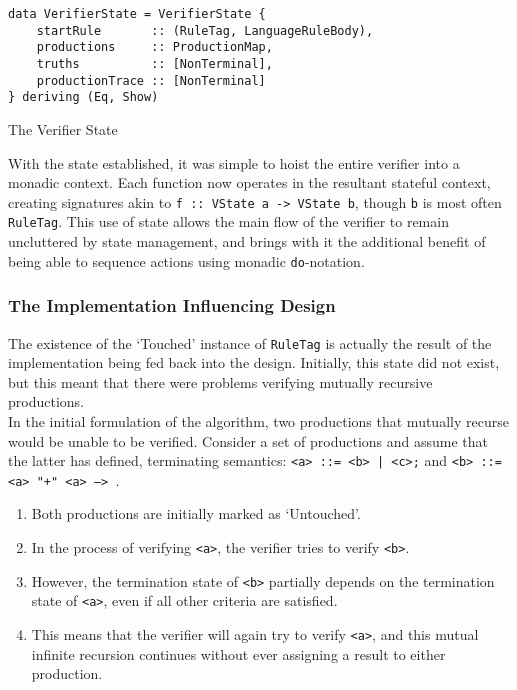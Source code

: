 \begin{listing}[!htb]
\begin{verbatim}
data VerifierState = VerifierState {
    startRule       :: (RuleTag, LanguageRuleBody),
    productions     :: ProductionMap,
    truths          :: [NonTerminal],
    productionTrace :: [NonTerminal]
} deriving (Eq, Show)
\end{verbatim}
\caption{The Verifier State}
\label{lst:the_verifier_state}
\end{listing}

With the state established, it was simple to hoist the entire verifier into a monadic context. 
Each function now operates in the resultant stateful context, creating signatures akin to \texttt{f :: VState a -> VState b}, though \texttt{b} is most often \texttt{RuleTag}.
This use of state allows the main flow of the verifier to remain uncluttered by state management, and brings with it the additional benefit of being able to sequence actions using monadic \texttt{do}-notation. 


\subsubsection{The Implementation Influencing Design} %
\label{ssub:the_implementation_influencing_design}
The existence of the `Touched' instance of \texttt{RuleTag} is actually the result of the implementation being fed back into the design. 
Initially, this state did not exist, but this meant that there were problems verifying mutually recursive productions. \\

In the initial formulation of the algorithm, two productions that mutually recurse would be unable to be verified.
Consider a set of productions and assume that the latter has defined, terminating semantics: \texttt{<a> ::= <b> | <c>;} and \texttt{<b> ::= <a> "+" <a> --> {}}.
\begin{enumerate}
    \item Both productions are initially marked as `Untouched'.
    \item In the process of verifying \texttt{<a>}, the verifier tries to verify \texttt{<b>}.
    \item However, the termination state of \texttt{<b>} partially depends on the termination state of \texttt{<a>}, even if all other criteria are satisfied.
    \item This means that the verifier will again try to verify \texttt{<a>}, and this mutual infinite recursion continues without ever assigning a result to either production.
\end{enumerate}

